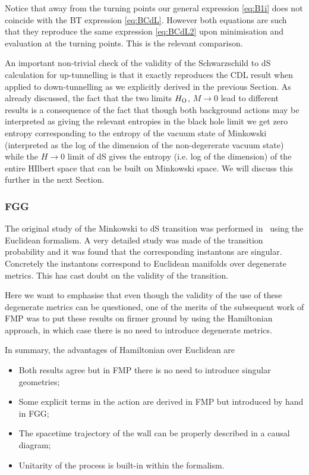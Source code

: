 \documentclass[11pt,a4paper]{article}
\begin{document}
Notice that away from the turning points our general expression \eqref{eq:B1i} does not coincide with the BT expression \eqref{eq:BCdL}. However both equations are such that they reproduce the same expression \eqref{eq:BCdL2} upon minimisation and evaluation at the turning points. This is the relevant comparison.

An important non-trivial check of the validity of the Schwarzschild to dS calculation for up-tunnelling is that it exactly reproduces the CDL result when applied to down-tunnelling as we explicitly derived in the previous Section. As already discussed, the fact that the two limits $H_{\rm O}$, $M \rightarrow 0$ lead to different results is a consequence of the fact that though both background actions may be interpreted as giving the relevant entropies in the black hole limit we get zero entropy corresponding to the entropy of the vacuum state of Minkowski (interpreted as the log of the dimension of the non-degererate vacuum state) while the $H\rightarrow 0$ limit of dS gives the entropy (i.e. log of the dimension) of the entire HIlbert space that can be built on Minkowski space. We will discuss this further in the next Section.

\subsubsection*{FGG}

The original study of the Minkowski to dS transition was performed in~\cite{Farhi:1989yr} using the Euclidean formalism. A very detailed study was made of the transition probability and it was found that  the corresponding instantons are singular. Concretely the instantons correspond to Euclidean manifolds over degenerate metrics. This has cast doubt on the validity of the transition.

Here we want to emphasise that even though the validity of the use of these degenerate metrics can be questioned, one of the merits of the subsequent work of FMP was to put these results on firmer ground  by using the Hamiltonian approach, in which case there is no need to introduce degenerate metrics.

In summary, the advantages of Hamiltonian over Euclidean are 
\begin{itemize}
\item{} Both results agree but in FMP there is no need to introduce singular geometries;
\item{} Some explicit terms in the action are derived in FMP but introduced by hand in FGG;
\item{} The spacetime trajectory of the wall can be properly described in a causal diagram;
\item{} Unitarity of the process is built-in within the formalism.
\end{itemize}
\end{document}
